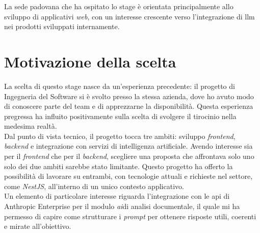 La sede padovana che ha ospitato lo stage è orientata principalmente allo sviluppo di applicativi \emph{web}, con un interesse crescente verso l'integrazione di \gls{llm} nei prodotti sviluppati internamente.

\section{Motivazione della scelta}

La scelta di questo stage nasce da un'esperienza precedente: il progetto di Ingegneria del Software si è svolto presso la stessa azienda, dove ho avuto modo di conoscere parte del team e di apprezzarne la disponibilità. Questa esperienza pregressa ha influito positivamente sulla scelta di svolgere il tirocinio nella medesima realtà.\\

Dal punto di vista tecnico, il progetto tocca tre ambiti: sviluppo \emph{frontend}, \emph{backend} e integrazione con servizi di intelligenza artificiale. Avendo interesse sia per il \emph{frontend} che per il \emph{backend}, scegliere una proposta che affrontava solo uno solo dei due ambiti sarebbe stato limitante. Questo progetto ha offerto la possibilità di lavorare su entrambi, con tecnologie attuali e richieste nel settore, come \emph{NestJS}, all'interno di un unico contesto applicativo.\\

Un elemento di particolare interesse riguarda l'integrazione con le \gls{api} di Anthropic Enterprise per il modulo \emph{\gls{ai}}\glsfirstoccur di analisi documentale, il quale mi ha permesso di capire come strutturare i \emph{prompt} per ottenere risposte utili, coerenti e mirate all'obiettivo.
